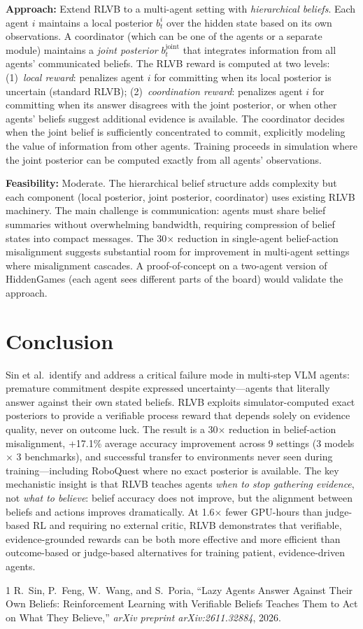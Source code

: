 \documentclass[11pt,a4paper]{article}
\begin{document}
\textbf{Approach:} Extend RLVB to a multi-agent setting with \emph{hierarchical beliefs}. Each agent $i$ maintains a local posterior $b^i_t$ over the hidden state based on its own observations. A coordinator (which can be one of the agents or a separate module) maintains a \emph{joint posterior} $b^{\text{joint}}_t$ that integrates information from all agents' communicated beliefs. The RLVB reward is computed at two levels: (1)~\emph{local reward}: penalizes agent $i$ for committing when its local posterior is uncertain (standard RLVB); (2)~\emph{coordination reward}: penalizes agent $i$ for committing when its answer disagrees with the joint posterior, or when other agents' beliefs suggest additional evidence is available. The coordinator decides when the joint belief is sufficiently concentrated to commit, explicitly modeling the value of information from other agents. Training proceeds in simulation where the joint posterior can be computed exactly from all agents' observations.

\textbf{Feasibility:} Moderate. The hierarchical belief structure adds complexity but each component (local posterior, joint posterior, coordinator) uses existing RLVB machinery. The main challenge is communication: agents must share belief summaries without overwhelming bandwidth, requiring compression of belief states into compact messages. The 30$\times$ reduction in single-agent belief-action misalignment suggests substantial room for improvement in multi-agent settings where misalignment cascades. A proof-of-concept on a two-agent version of HiddenGames (each agent sees different parts of the board) would validate the approach.

\section{Conclusion}
Sin et al.\ identify and address a critical failure mode in multi-step VLM agents: premature commitment despite expressed uncertainty---agents that literally answer against their own stated beliefs. RLVB exploits simulator-computed exact posteriors to provide a verifiable process reward that depends solely on evidence quality, never on outcome luck. The result is a 30$\times$ reduction in belief-action misalignment, +17.1\% average accuracy improvement across 9 settings (3 models $\times$ 3 benchmarks), and successful transfer to environments never seen during training---including RoboQuest where no exact posterior is available. The key mechanistic insight is that RLVB teaches agents \emph{when to stop gathering evidence}, not \emph{what to believe}: belief accuracy does not improve, but the alignment between beliefs and actions improves dramatically. At 1.6$\times$ fewer GPU-hours than judge-based RL and requiring no external critic, RLVB demonstrates that verifiable, evidence-grounded rewards can be both more effective and more efficient than outcome-based or judge-based alternatives for training patient, evidence-driven agents.

\begin{thebibliography}{1}
R.~Sin, P.~Feng, W.~Wang, and S.~Poria,
``Lazy Agents Answer Against Their Own Beliefs: Reinforcement Learning with Verifiable Beliefs Teaches Them to Act on What They Believe,''
\textit{arXiv preprint arXiv:2611.32884}, 2026.
\end{thebibliography}
\end{document}
